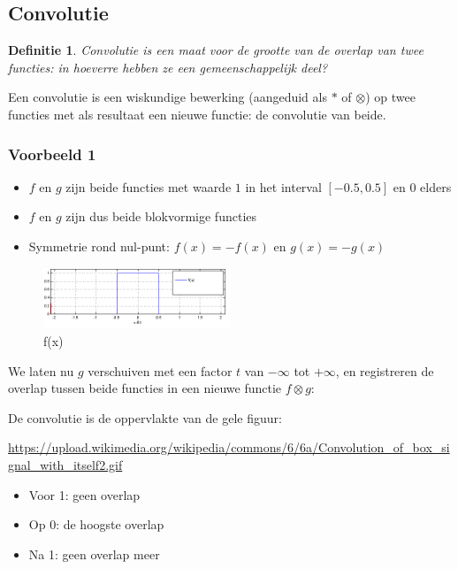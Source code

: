 \documentclass{article}
\newtheorem{theorem}{Definitie}[section]
\begin{document}
\subsection{Convolutie}

\begin{theorem}
    Convolutie is een maat voor de grootte van de overlap van twee functies: 
    in hoeverre hebben ze een gemeenschappelijk deel?
\end{theorem}

Een convolutie is een wiskundige bewerking (aangeduid als $*$ of $\otimes$) op twee functies
met als resultaat een nieuwe functie: de convolutie van beide.

\subsubsection{Voorbeeld 1}

\begin{itemize}
    \item $f$ en $g$ zijn beide functies met waarde $1$ in het interval $[-0.5, 0.5]$ en $0$ elders
    \item $f$ en $g$ zijn dus beide blokvormige functies
    \item Symmetrie rond nul-punt: $f(x) = -f(x)$ en $g(x) = -g(x)$
\end{itemize}

\begin{figure}[H]
    \centering
    \includegraphics[width=0.5\textwidth]{convolutie-voorbeeld1.png}
    \caption{f(x)}
\end{figure}

We laten nu $g$ verschuiven met een factor $t$ van $-\infty$ tot $+\infty$,
en registreren de overlap tussen beide functies in een nieuwe functie $f \otimes g$:

De convolutie is de oppervlakte van de gele figuur:

\url{https://upload.wikimedia.org/wikipedia/commons/6/6a/Convolution_of_box_signal_with_itself2.gif}

\begin{itemize}
    \item Voor 1: geen overlap
    \item Op 0: de hoogste overlap
    \item Na 1: geen overlap meer
\end{itemize}
\end{document}
